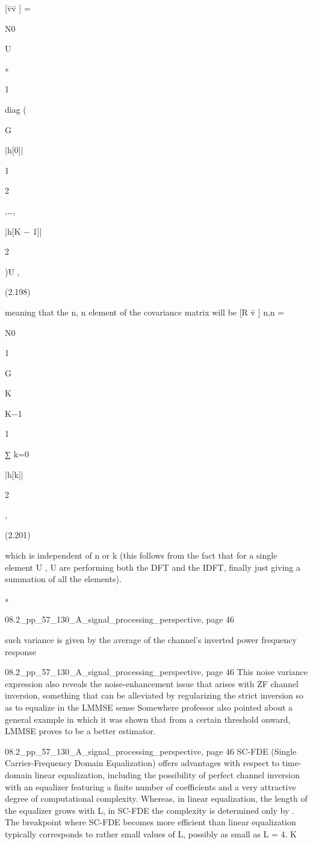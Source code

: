 {{[v̄v̄ ] =

N0

U

∗

1

diag (

G

|h[0]|

1

2

,…,

|h[K − 1]|

2

)U ,

(2.198)

meaning that the n, n element of the covariance matrix will be
[R v̄ ] n,n =

N0

1

G

K

K−1

1

∑
k=0

|h[k]|

2

,

(2.201)

which is independent of n or k (this follows from the fact that for a single element U , U are performing both the DFT and the IDFT, finally just giving a summation of all the elements).

∗

08.2_pp_57_130_A_signal_processing_perspective, page 46

such variance is given by the average of the channel’s inverted power frequency response

08.2_pp_57_130_A_signal_processing_perspective, page 46 This noise variance expression also reveals the noise-enhancement issue that arises with ZF channel inversion, something that can be alleviated by regularizing the strict inversion so as to equalize in the LMMSE sense Somewhere professor also pointed about a general example in which it was shown that from a certain threshold onward, LMMSE proves to be a better estimator.

08.2_pp_57_130_A_signal_processing_perspective, page 46 SC-FDE (Single Carrier-Frequency Domain Equalization) offers advantages with respect to time-domain linear equalization, including the possibility of perfect channel inversion with an equalizer featuring a finite number of coefficients and a very attractive degree of computational complexity. Whereas, in linear equalization, the length of the equalizer grows with L, in SC-FDE the complexity is determined only by
. The breakpoint where SC-FDE becomes more efficient than linear equalization typically corresponds to rather small values of L, possibly as small as L = 4.
K

}}
